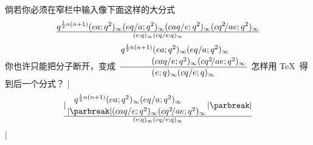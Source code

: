 \ddangerexercise 倘若你必须在窄栏中输入像下面这样的大分式
$$\def\\#1;{(#1;q^2)_\infty}
q^{{1\over2}n(n+1)}\\ea;\\eq/a;\\caq/e;\\cq^2\!/ae;
\over(e;q)_\infty(cq/e;q)_\infty$$
\1你也许只能把分子断开，变成
\begindisplay
$\displaystyle{\def\\#1;{(#1;q^2)_\infty}
\displaystyle{q^{{1\over2}n(n+1)}\\ea;\\eq/a;\qquad\atop
  \hfill\\caq/e;\\cq^2\!/ae;}
\over(e;q)_\infty(cq/e;q)_\infty}$
\enddisplay
怎样用 \TeX\ 得到后一个分式？
\answer |$$\def\\#1;{(#1;q^2)_\infty} %
        |\displaystyle{q^{{1\over2}n(n+1)}\\ea;\\eq/a;\qquad\atop|\parbreak
        |  \hfill\\caq/e;\\cq^2\!/ae;}|\parbreak
        |\over(e;q)_\infty(cq/e;q)_\infty$$|


